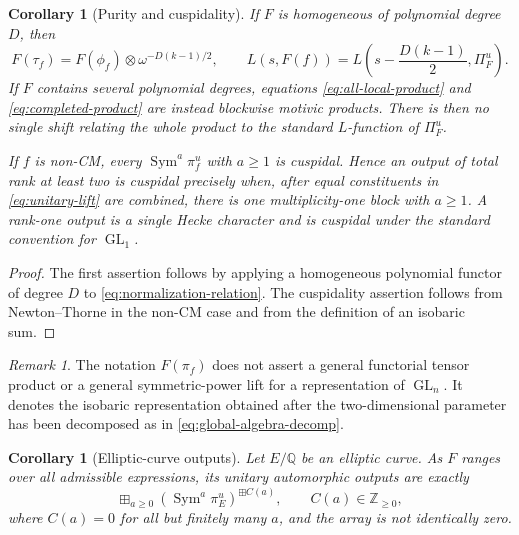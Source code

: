 \documentclass[11pt,reqno]{amsart}
\newtheorem{corollary}[theorem]{Corollary}
\theoremstyle{definition}
\theoremstyle{remark}
\newtheorem{remark}[theorem]{Remark}
\newcommand{\Q}{\mathbb Q}
\newcommand{\Z}{\mathbb Z}
\newcommand{\GL}{\operatorname{GL}}
\newcommand{\Sym}{\operatorname{Sym}}
\begin{document}
\begin{corollary}[Purity and cuspidality]\label{cor:purity-cuspidality}
If $F$ is homogeneous of polynomial degree $D$, then
\begin{equation}\label{eq:homogeneous-shift}
 F(\tau_f)=F(\phi_f)\otimes\omega^{-D(k-1)/2},
 \qquad
 L(s,F(f))=L\left(s-\frac{D(k-1)}2,\Pi_F^u\right).
\end{equation}
If $F$ contains several polynomial degrees, equations
\eqref{eq:all-local-product} and \eqref{eq:completed-product} are instead
blockwise motivic products.  There is then no single shift relating the
whole product to the standard $L$-function of $\Pi_F^u$.

If $f$ is non-CM, every $\Sym^a\pi_f^u$ with $a\geq1$ is cuspidal.  Hence
an output of total rank at least two is cuspidal precisely when, after equal
constituents in \eqref{eq:unitary-lift} are combined, there is one
multiplicity-one block with $a\geq1$.  A rank-one output is a single Hecke
character and is cuspidal under the standard convention for $\GL_1$.
\end{corollary}

\begin{proof}
The first assertion follows by applying a homogeneous polynomial functor of
degree $D$ to \eqref{eq:normalization-relation}.  The cuspidality assertion
follows from Newton--Thorne in the non-CM case and from the definition of an
isobaric sum.
\end{proof}

\begin{remark}\label{rem:no-general-functoriality}
The notation $F(\pi_f)$ does not assert a general functorial tensor product or
a general symmetric-power lift for a representation of $\GL_n$.  It denotes
the isobaric representation obtained after the two-dimensional parameter has
been decomposed as in \eqref{eq:global-algebra-decomp}.
\end{remark}

\begin{corollary}[Elliptic-curve outputs]\label{cor:all-unitary}
Let $E/\Q$ be an elliptic curve.  As $F$ ranges over all admissible
expressions, its unitary automorphic outputs
are exactly
\begin{equation}\label{eq:all-unitary}
 \boxplus_{a\geq0}
 \left(\Sym^a\pi_E^u\right)^{\boxplus C(a)},
 \qquad C(a)\in\Z_{\geq0},
\end{equation}
where $C(a)=0$ for all but finitely many $a$, and the array is not identically
zero.
\end{corollary}
\end{document}

